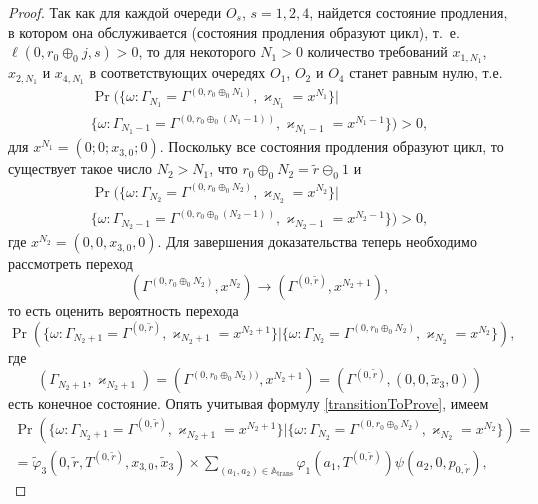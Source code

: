 \begin{proof}
Так как для каждой очереди $O_s$,  $s=1, 2, 4$,  найдется состояние продления,  в котором она обслуживается (состояния продления образуют цикл),  т.~е. $\ell(0,  r_0\oplus_{0}j,  s)>0$,  то для некоторого $N_1>0$ количество требований $x_{1,  N_1}$,  $x_{2,  N_1}$ и $x_{4,  N_1}$ в соответствующих очередях $O_1$,  $O_2$ и $O_4$ станет равным нулю,  т.е. 
\begin{multline*}
\Pr (\{\omega\colon\Gamma_{N_1}=\Gamma^{(0,  r_0\oplus_{0}N_1)}, \varkappa_{N_1}=x^{N_1} \}|\\ \{\omega\colon\Gamma_{N_1-1}=\Gamma^{(0,  r_0\oplus_{0}(N_1-1))},  \varkappa_{N_1-1}=x^{N_1-1}\}) > 0, 
\end{multline*}
для $x^{N_1} = \left(0; 0; x_{3,  0};0\right)$. Поскольку все состояния продления образуют цикл,  то существует такое число $N_2>N_1$,  что $r_0 \oplus_0  N_2 = \tilde{r} \ominus_0 1$ и 
\begin{multline*}
\Pr (\{\omega\colon\Gamma_{N_2}=\Gamma^{(0,  r_0\oplus_{0} N_2)}, \varkappa_{N_2}=x^{N_2} \}|\\ \{\omega\colon\Gamma_{N_2-1}=\Gamma^{(0,  r_0\oplus_{0}(N_2-1))}, \varkappa_{N_2-1}=x^{N_2-1}\}) > 0, 
\end{multline*}
где $x^{N_2} = (0, 0, x_{3, 0}, 0)$.
Для завершения доказательства теперь необходимо рассмотреть переход
\begin{equation*}
 (\Gamma^{(0,  r_0\oplus_{0} N_2)},  x^{N_2})  \rightarrow (\Gamma^{(0,  \tilde{r})},  x^{N_2+1}), 
\end{equation*}
то есть оценить вероятность перехода
\begin{equation*}
\Pr (\{\omega\colon\Gamma_{N_2+1}=\Gamma^{(0,  \tilde{r})},  \varkappa_{N_2+1}= x^{N_2+1} \}| \{\omega\colon\Gamma_{N_2}=\Gamma^{(0,  r_0\oplus_{0}N_2)},  \varkappa_{N_2}=x^{N_2}\}), 
\end{equation*}
где 
$$(\Gamma_{N_2+1},  \varkappa_{N_2+1})= (\Gamma^{(0,  r_0\oplus_{0} N_2))},  x^{N_2+1}) = (\Gamma^{(0,  \tilde{r})} ,  (0,  0,  \tilde{x}_3,  0) )$$
есть конечное состояние.
Опять учитывая формулу \eqref{transitionToProve},  имеем
\begin{multline*}
\Pr (\{\omega\colon\Gamma_{N_2+1}=\Gamma^{(0,  \tilde{r})}, \varkappa_{N_2+1}=x^{N_2+1} \}| \{\omega\colon\Gamma_{N_2}=\Gamma^{(0,  r_0\oplus_{0}N_2)}, \varkappa_{N_2}=x^{N_2}\})=\\
=\widetilde{\varphi}_3(0,  \tilde{r},  T^{(0,  \tilde{r})},  x_{3,  0}, \tilde{x}_3)
\times
\sum_{(a_1,  a_2)\in {\mathbb A}_{\mathrm{trans}}}\varphi_1(a_1,  T^{(0,  \tilde{r})})  \psi(a_2,  0,  p_{0,  \tilde{r}}), 

\end{multline*}
\end{proof}
